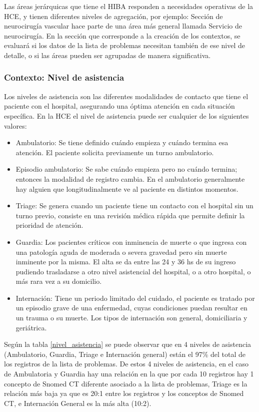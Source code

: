 Las áreas jerárquicas que tiene el \acrshort{HIBA} responden a necesidades operativas de la \acrshort{HCE}, y tienen diferentes niveles de agregación, por ejemplo: Sección de neurocirugía vascular hace parte de una área más general llamada Servicio de neurocirugía. En la sección que corresponde a la creación de los contextos, se evaluará si los datos de la lista de problemas necesitan también de ese nivel de detalle, o si las áreas pueden ser agrupadas de manera significativa. 

\subsubsection{Contexto: Nivel de asistencia}
Los niveles de asistencia son las diferentes modalidades de contacto que tiene el paciente con el hospital, asegurando una óptima atención en cada situación específica. En la \acrshort{HCE} el nivel de asistencia puede ser cualquier de los siguientes valores:

\begin{itemize}
\item Ambulatorio: Se tiene definido cuándo empieza y cuándo termina esa atención. El paciente solicita previamente un turno ambulatorio.
\item Episodio ambulatorio: Se sabe cuándo empieza pero no cuándo termina; entonces la modalidad de registro cambia. En el ambulatorio generalmente hay alguien que longitudinalmente ve al paciente en distintos momentos.
\item Triage: Se genera cuando un paciente tiene un contacto con el hospital sin un turno previo, consiste en una revisión médica rápida que permite definir la prioridad de atención.
\item Guardia: Los pacientes críticos con inminencia de muerte o que ingresa con una patología aguda de moderada o severa gravedad pero sin muerte inminente por la misma. El alta se da entre las 24 y 36 hs de su ingreso pudiendo trasladarse a otro nivel asistencial del hospital, o a otro hospital, o más rara vez a su domicilio.
\item Internación: Tiene un periodo limitado del cuidado, el paciente es tratado por un episodio grave de una enfermedad, cuyas condiciones puedan resultar en un trauma o su muerte. Los tipos de internación son general, domiciliaria y geriátrica.
\end{itemize}

Según la tabla \ref{nivel_asistencia} se puede observar que en 4 niveles de asistencia (Ambulatorio, Guardia, Triage e Internación general) están el 97\% del total de los registros de la lista de problemas. De estos 4 niveles de asistencia, en el caso de Ambulatoria y Guardia hay una relación en la que por cada 10 registros hay 1 concepto de Snomed CT diferente asociado a la lista de problemas, Triage es la relación más baja ya que es 20:1 entre los registros y los conceptos de Snomed  CT, e Internación General es la más alta (10:2).


